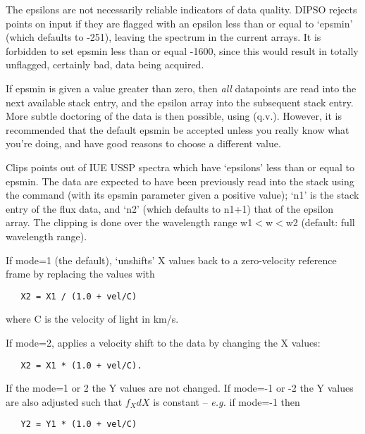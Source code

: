 \begin {description}
The epsilons are not necessarily reliable indicators of data quality.
DIPSO rejects points on input if they are flagged with an epsilon less
than or equal to `epsmin' (which defaults to -251), leaving the
spectrum in the current arrays. It is forbidden to set epsmin less
than or equal -1600, since this would result in totally unflagged,
certainly bad, data being acquired.

If epsmin is given a value greater than zero, then {\em all}
datapoints are read into the next available stack entry, and the
epsilon array into the subsequent stack entry. More subtle doctoring
of the data is then possible, using   (q.v.). However, it is
recommended that the default epsmin be accepted unless you really know
what you're doing, and have good reasons to choose a different value.

Clips points out of IUE USSP spectra which have `epsilons' less than
or equal to epsmin. The data are expected to have been previously read
into the stack using the   command (with its epsmin parameter
given a positive value); `n1' is the stack entry of the flux data, and
`n2' (which defaults to n1+1) that of the epsilon array. The clipping
is done over the wavelength range w1$<$w$<$w2 (default: full
wavelength range).

If mode=1 (the default),   `unshifts' X values back to a
zero-velocity reference frame by replacing the values with

\begin{verbatim}
   X2 = X1 / (1.0 + vel/C)
\end{verbatim}

where C is the velocity of light in km/s.

If mode=2,   applies a velocity shift to the data by changing the
X values:

\begin{verbatim}
   X2 = X1 * (1.0 + vel/C).
\end{verbatim}

If the mode=1 or 2 the Y values are not changed. If mode=-1 or -2 the
Y values are also adjusted such that $f_{X}dX$ is constant -- {\it
e.g.} if mode=-1 then

\begin{verbatim}
   Y2 = Y1 * (1.0 + vel/C)
\end{verbatim}


\end{description}
